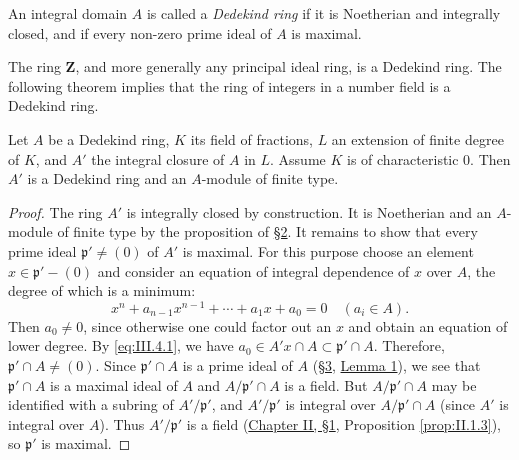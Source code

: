 
\begin{definition}
\label{def:III.4.1}
An integral domain $A$ is called a \emph{Dedekind ring} if it is Noetherian
and integrally closed, and if every non-zero prime ideal of $A$ is maximal.
\end{definition}

The ring $\mathbf{Z}$, and more generally any principal ideal ring, is a
Dedekind ring. The following theorem implies that the ring of integers in a
number field is a Dedekind ring.

\begin{theorem}
\label{thm:III.4.1}
Let $A$ be a Dedekind ring, $K$ its field of fractions, $L$ an extension of
finite degree of $K$, and $A'$ the integral closure of $A$ in $L$. Assume $K$
is of characteristic $0$. Then $A'$ is a Dedekind ring and an $A$-module of
finite type.
\end{theorem}

\begin{proof}
The ring $A'$ is integrally closed by construction. It is Noetherian and an
$A$-module of finite type by the proposition of \hyperref[sec:3.2]{§2}. It remains to show that
every prime ideal $\mathfrak{p}'\neq(0)$ of $A'$ is maximal. For this purpose
choose an element $x\in\mathfrak{p}'-(0)$ and consider an equation of
integral dependence of $x$ over $A$, the degree of which is a minimum:
\begin{equation}
x^{n}+a_{n-1}x^{n-1}+\cdots+a_{1}x+a_{0}=0\quad(a_{i}\in A).
\label{eq:III.4.1}
\end{equation}
Then $a_{0}\neq0$, since otherwise one could factor out an $x$ and obtain an
equation of lower degree. By \eqref{eq:III.4.1}, we have
$a_{0}\in A'x\cap A\subset\mathfrak{p}'\cap A$. Therefore,
$\mathfrak{p}'\cap A\neq(0)$. Since $\mathfrak{p}'\cap A$ is a prime ideal
of $A$ (\hyperref[sec:3.3]{§3}, \hyperref[lem:III.3.1]{Lemma 1}), we see that $\mathfrak{p}'\cap A$ is a maximal ideal of
$A$ and $A/\mathfrak{p}'\cap A$ is a field. But $A/\mathfrak{p}'\cap A$ may be
identified with a subring of $A'/\mathfrak{p}'$, and $A'/\mathfrak{p}'$ is
integral over $A/\mathfrak{p}'\cap A$ (since $A'$ is integral over $A$). Thus
$A'/\mathfrak{p}'$ is a field (\hyperref[sec:2.1]{Chapter II, §1}, Proposition \ref{prop:II.1.3}),
so $\mathfrak{p}'$ is maximal.
\end{proof}

